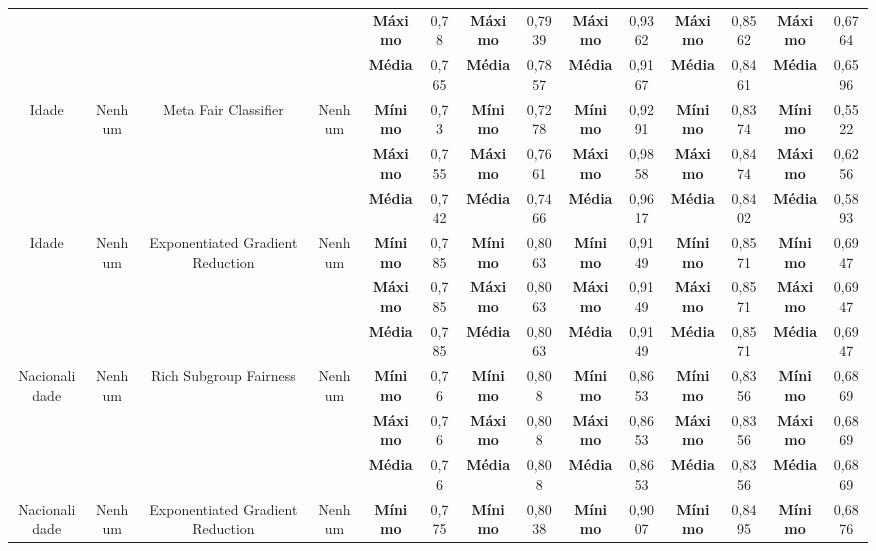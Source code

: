 \documentclass[portugues]{ic-tese}
\begin{document}
\begin{table}[H]
\begin{center}
{\begin{tabular}{c|c|c|c|c|c|c|c|c|c|c|c|c|c}
             & & & & \textbf{Máximo} & 0,78 & \textbf{Máximo} & 0,7939 & \textbf{Máximo} & 0,9362 & \textbf{Máximo} & 0,8562 & \textbf{Máximo} & 0,6764 \\
             & & & & \textbf{Média} & 0,765 & \textbf{Média} & 0,7857 & \textbf{Média} & 0,9167 & \textbf{Média} & 0,8461 & \textbf{Média} & 0,6596 \\
            \hline
            \multirow{3}{*}{Idade} & \multirow{3}{*}{Nenhum} & \multirow{3}{*}{Meta Fair Classifier} & \multirow{3}{*}{Nenhum} & \textbf{Mínimo} & 0,73 & \textbf{Mínimo} & 0,7278 & \textbf{Mínimo} & 0,9291 & \textbf{Mínimo} & 0,8374 & \textbf{Mínimo} & 0,5522 \\
             & & & & \textbf{Máximo} & 0,755 & \textbf{Máximo} & 0,7661 & \textbf{Máximo} & 0,9858 & \textbf{Máximo} & 0,8474 & \textbf{Máximo} & 0,6256 \\
             & & & & \textbf{Média} & 0,742 & \textbf{Média} & 0,7466 & \textbf{Média} & 0,9617 & \textbf{Média} & 0,8402 & \textbf{Média} & 0,5893 \\
            \hline
            \multirow{3}{*}{Idade} & \multirow{3}{*}{Nenhum} & \multirow{3}{*}{Exponentiated Gradient Reduction} & \multirow{3}{*}{Nenhum} & \textbf{Mínimo} & 0,785 & \textbf{Mínimo} & 0,8063 & \textbf{Mínimo} & 0,9149 & \textbf{Mínimo} & 0,8571 & \textbf{Mínimo} & 0,6947 \\
             & & & & \textbf{Máximo} & 0,785 & \textbf{Máximo} & 0,8063 & \textbf{Máximo} & 0,9149 & \textbf{Máximo} & 0,8571 & \textbf{Máximo} & 0,6947 \\
             & & & & \textbf{Média} & 0,785 & \textbf{Média} & 0,8063 & \textbf{Média} & 0,9149 & \textbf{Média} & 0,8571 & \textbf{Média} & 0,6947 \\
            \hline
            \multirow{3}{*}{Nacionalidade} & \multirow{3}{*}{Nenhum} & \multirow{3}{*}{Rich Subgroup Fairness} & \multirow{3}{*}{Nenhum} & \textbf{Mínimo} & 0,76 & \textbf{Mínimo} & 0,808 & \textbf{Mínimo} & 0,8653 & \textbf{Mínimo} & 0,8356 & \textbf{Mínimo} & 0,6869 \\
             & & & & \textbf{Máximo} & 0,76 & \textbf{Máximo} & 0,808 & \textbf{Máximo} & 0,8653 & \textbf{Máximo} & 0,8356 & \textbf{Máximo} & 0,6869 \\
             & & & & \textbf{Média} & 0,76 & \textbf{Média} & 0,808 & \textbf{Média} & 0,8653 & \textbf{Média} & 0,8356 & \textbf{Média} & 0,6869 \\
            \hline
            \multirow{3}{*}{Nacionalidade} & \multirow{3}{*}{Nenhum} & \multirow{3}{*}{Exponentiated Gradient Reduction} & \multirow{3}{*}{Nenhum} & \textbf{Mínimo} & 0,775 & \textbf{Mínimo} & 0,8038 & \textbf{Mínimo} & 0,9007 & \textbf{Mínimo} & 0,8495 & \textbf{Mínimo} & 0,6876 \\

\end{tabular}}
\end{center}
\end{table}
\end{document}
